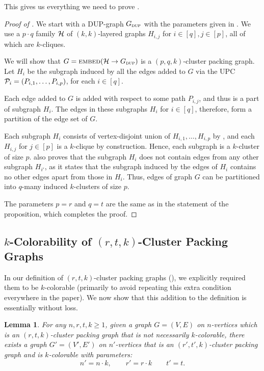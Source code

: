 \documentclass[11pt]{article}
\newtheorem{lemma}{Lemma}[section]
\theoremstyle{definition}
\renewcommand{\geq}{\geqslant}
\begin{document}
This gives us everything we need to prove .
\begin{proof}[Proof of ]
	We start with a DUP-graph $G_{\textsc{dup}}$ with the parameters given in . 
	We use a $p \cdot q$ family $\mathcal{H}$ of $(k, k)$-layered graphs $H_{i,j}$ for $i \in[q], j \in [p]$, all of which are $k$-cliques. 
	
	We will show that $G = \textnormal{\textsc{embed}}(\mathcal{H} \rightarrow G_{\textsc{dup}})$ is a $(p, q, k)$-cluster packing graph. Let $H_i$ be the subgraph induced by all the edges added to $G$ via the UPC $\mathcal{P}_i = (P_{i,1}, \ldots, P_{i,p})$, for each $i \in [q]$. 
	
	Each edge added to $G$ is added with respect to some path $P_{i,j}$, and thus is a part of subgraph $H_i$. The edges in these subgraphs $H_i$ for $i \in [q]$, therefore, form a partition of the edge set of $G$. 
	
	Each subgraph $H_i$ consists of vertex-disjoint union of $H_{i,1}, \ldots, H_{i,p}$ by , and each $H_{i,j}$ for $j \in [p]$ is a $k$-clique by construction. Hence, each subgraph is a $k$-cluster of size $p$.   also proves that the subgraph $H_i$ does not contain edges from any other subgraph $H_{i'}$, as it states that the subgraph induced by the edges of $H_i$ contains no other edges apart from those in $H_i$. 
	Thus, edges of graph $G$ can be partitioned into $q$-many induced $k$-clusters of size $p$. 
	
	The parameters $p = r$ and $q = t$ are the same as in the statement of the proposition, which completes the proof. 
\end{proof}

\subsection{$k$-Colorability of $(r,t,k)$-Cluster Packing Graphs}\label{app:cpg-k-color}

In our definition of $(r,t,k)$-cluster packing graphs (), we explicitly required them to be $k$-colorable (primarily to avoid repeating this extra condition everywhere in the paper). We now show 
that this addition to the definition is essentially without loss.

\begin{lemma}\label{lem:coloring-k-packing}
For any $n, r, t, k \geq 1$, given a graph $G = (V, E)$ on $n$-vertices which is an $(r,t,k)$-cluster packing graph that is not necessarily $k$-colorable, there exists a graph $G' = (V', E')$ on $n'$-vertices that is an $(r', t', k)$-cluster packing graph and \emph{is} $k$-colorable with parameters:
\[
	n' = n \cdot k, \qquad r' = r \cdot k \qquad t' = t.
\]
\end{lemma}
\end{document}
